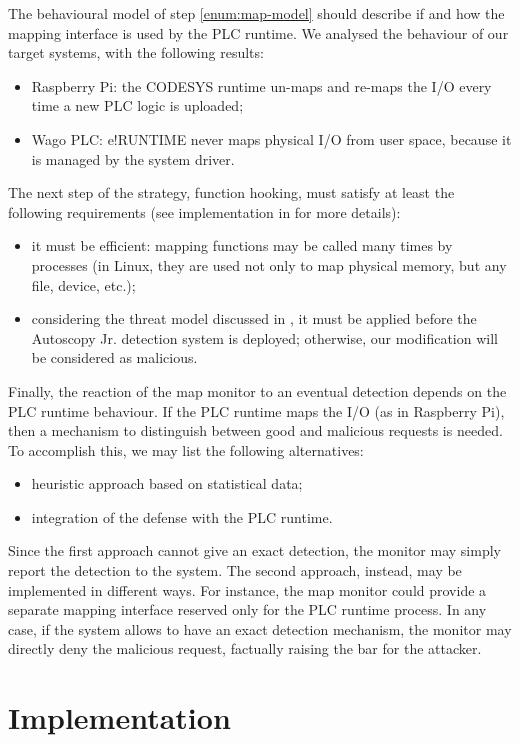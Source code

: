 The behavioural model of step \ref{enum:map-model} should describe if and how the mapping interface is used by the PLC runtime.
We analysed the behaviour of our target systems, with the following results:
\begin{itemize}
	\item Raspberry Pi: the CODESYS runtime un-maps and re-maps the I/O every time a new PLC logic is uploaded;
	\item Wago PLC: e!RUNTIME never maps physical I/O from user space, because it is managed by the system driver.
\end{itemize}
The next step of the strategy, function hooking, must satisfy at least the following requirements (see implementation in  for more details):
\begin{itemize}
	\item it must be efficient: mapping functions may be called many times by processes (\eg in Linux, they are used not only to map physical memory,
		but any file, device, etc.);
	\item considering the threat model discussed in , it must be applied before the Autoscopy Jr. detection system is deployed;
		otherwise, our modification will be considered as malicious.
\end{itemize}

Finally, the reaction of the map monitor to an eventual detection depends on the PLC runtime behaviour. If the PLC runtime maps the I/O (as in Raspberry Pi),
then a mechanism to distinguish between good and malicious requests is needed. To accomplish this, we may list the following alternatives:
\begin{itemize}
	\item heuristic approach based on statistical data;
	\item integration of the defense with the PLC runtime.
\end{itemize}
Since the first approach cannot give an exact detection, the monitor may simply report the detection to the system.
The second approach, instead, may be implemented in different ways. For instance, the map monitor could provide a separate mapping interface
reserved only for the PLC runtime process.
In any case, if the system allows to have an exact detection mechanism, the monitor may directly deny the malicious request, factually raising the bar for the attacker.


\section{Implementation}
\label{sec:def-impl}

